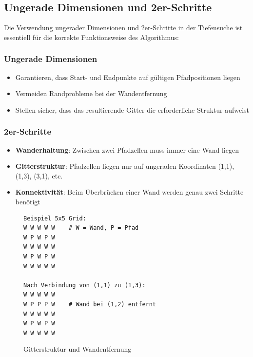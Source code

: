 \documentclass[12pt,a4paper]{article}
\begin{document}
\subsection{Ungerade Dimensionen und 2er-Schritte}

Die Verwendung ungerader Dimensionen und 2er-Schritte in der Tiefensuche ist essentiell für die korrekte Funktionsweise des Algorithmus:

\subsubsection{Ungerade Dimensionen}
\begin{itemize}
    \item Garantieren, dass Start- und Endpunkte auf gültigen Pfadpositionen liegen
    \item Vermeiden Randprobleme bei der Wandentfernung
    \item Stellen sicher, dass das resultierende Gitter die erforderliche Struktur aufweist
\end{itemize}

\subsubsection{2er-Schritte}
\begin{itemize}
    \item \textbf{Wanderhaltung}: Zwischen zwei Pfadzellen muss immer eine Wand liegen
    \item \textbf{Gitterstruktur}: Pfadzellen liegen nur auf ungeraden Koordinaten (1,1), (1,3), (3,1), etc.
    \item \textbf{Konnektivität}: Beim Überbrücken einer Wand werden genau zwei Schritte benötigt
\end{itemize}

\begin{figure}[H]
\centering
\begin{verbatim}
Beispiel 5x5 Grid:
W W W W W    # W = Wand, P = Pfad
W P W P W
W W W W W
W P W P W
W W W W W

Nach Verbindung von (1,1) zu (1,3):
W W W W W
W P P P W    # Wand bei (1,2) entfernt
W W W W W
W P W P W
W W W W W
\end{verbatim}
\caption{Gitterstruktur und Wandentfernung}
\end{figure}
\end{document}
